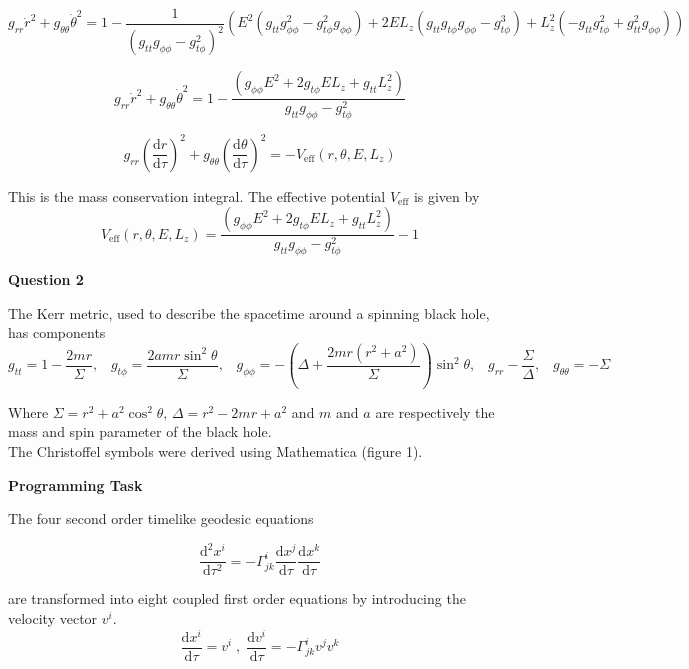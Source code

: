 \documentclass[12pt]{extarticle}
\begin{document}
$$g_{rr}\dot{r}^2+g_{\theta \theta}\dot{\theta}^2 = 1 -\frac{1}{\left(g_{tt}g_{\phi\phi}-g_{t\phi}^2\right)^2}\left(E^2 \left(g_{tt}g_{\phi\phi}^2-g_{t\phi}^2g_{\phi\phi}\right)+2EL_z\left(g_{tt}g_{t\phi}g_{\phi \phi} - g_{t\phi}^3 \right) + L_z^2\left(-g_{tt}g_{t\phi}^2+g_{tt}^2 g_{\phi \phi}\right)\right)$$

$$g_{rr}\dot{r}^2+g_{\theta \theta}\dot{\theta}^2 = 1 - \frac{\left(g_{\phi \phi}E^2+2g_{t\phi}EL_z+g_{tt}L_z^2\right)}{g_{tt}g_{\phi\phi}-g_{t\phi}^2}$$

$$g_{rr}\left(\frac{\mathrm{d}r}{\mathrm{d}\tau}\right)^2+g_{\theta \theta}\left(\frac{\mathrm{d}\theta}{\mathrm{d}\tau}\right)^2 = -V_{\mathrm{eff}}(r,\theta,E,L_z)$$

This is the mass conservation integral. The effective potential $V_{\mathrm{eff}}$ is given by
$$V_{\mathrm{eff}}(r,\theta,E,L_z) = \frac{\left(g_{\phi \phi}E^2+2g_{t\phi}EL_z+g_{tt}L_z^2\right)}{g_{tt}g_{\phi\phi}-g_{t\phi}^2}-1$$

\begin{center}
\textbf{Question 2}
\end{center}

The Kerr metric, used to describe the spacetime around a spinning black hole, has components
$$g_{tt} = 1-\frac{2mr}{\Sigma}, \;\;\; g_{t\phi} = \frac{2amr\sin^2\theta}{\Sigma}, \;\;\; g_{\phi \phi} = -\left(\Delta + \frac{2mr(r^2+a^2)}{\Sigma}\right)\sin^2\theta, \;\;\; g_{rr}-\frac{\Sigma}{\Delta},\;\;\; g_{\theta \theta} = -\Sigma$$ 

Where $\Sigma = r^2+a^2\cos^2\theta,\, \Delta = r^2-2mr+a^2$ and $m$ and $a$ are respectively the mass and spin parameter of the black hole.\\

The Christoffel symbols were derived using Mathematica (figure 1). 

\begin{center}
\textbf{Programming Task}
\end{center}

The four second order timelike geodesic equations 

$$\frac{\mathrm{d}^2x^i}{\mathrm{d}\tau^2} = -\Gamma_{jk}^i\frac{\mathrm{d}x^j}{\mathrm{d}\tau}\frac{\mathrm{d}x^k}{\mathrm{d}\tau}$$

are transformed into eight coupled first order equations by introducing the velocity vector $v^i$.
$$\frac{\mathrm{d}x^i}{\mathrm{d}\tau} = v^i\;,\;\frac{\mathrm{d}v^i}{\mathrm{d}\tau} = -\Gamma_{jk}^iv^jv^k$$
\end{document}
